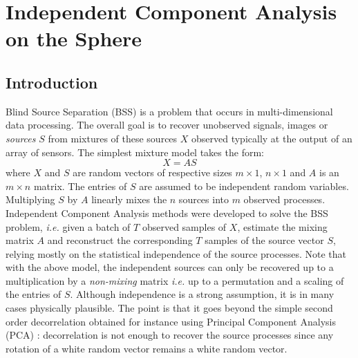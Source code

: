 

\chapter[ICA on the Sphere]{Independent Component Analysis on the Sphere}
\label{ch_mrs_ica}


\section{Introduction}


Blind Source Separation (BSS) is a problem that occurs in multi-dimensional data processing. The overall goal is to recover 
unobserved signals, images or \emph{sources} $S$ from mixtures of these sources $X$ observed typically at the output of an 
array of sensors. The simplest mixture model takes the form:
\begin{equation}\label{model0}
X = A S
\end{equation}
where $X$ and $S$ are random vectors of respective sizes $m \times 1$, $n \times 1$ and $A$ is an $m \times n$ matrix. The 
entries of $S$ are assumed to be independent random variables. Multiplying $S$ by $A$ linearly mixes the $n$ sources into 
$m$ observed processes. \\ 
   
Independent Component Analysis methods were developed to solve the BSS problem, \emph{i.e.} given a batch of $T$ observed 
samples of $X$, estimate the mixing matrix $A$ and reconstruct the corresponding $T$ samples of the source vector $S$, relying 
mostly on the statistical independence of the source processes. Note that with the above model, the independent sources can 
only be recovered up to a multiplication by a \emph{non-mixing} matrix \emph{i.e.} up to a permutation and a scaling of the 
entries of $S$. Although independence is a strong assumption, it is in many cases physically plausible. The point is that 
it goes beyond the simple second order decorrelation obtained for instance using Principal Component Analysis (PCA) : decorrelation 
is not enough to recover the source processes since any rotation of a white random vector remains a white random vector.\\


